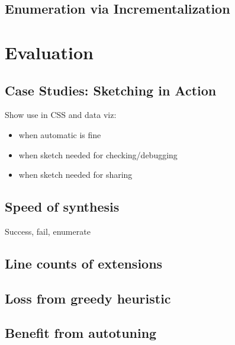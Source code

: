 \subsection{Enumeration via Incrementalization}

\section{Evaluation}
\subsection{Case Studies: Sketching in Action}
Show use in CSS and data viz: 
\begin{itemize}
\item when automatic is fine
\item when sketch needed for checking/debugging
\item when sketch needed for sharing
\end{itemize}
\subsection{Speed of synthesis}
Success, fail, enumerate
\subsection{Line counts of extensions}
\subsection{Loss from greedy heuristic}
\subsection{Benefit from autotuning}


